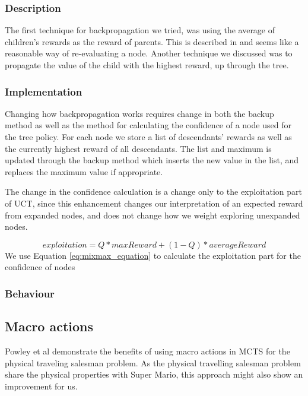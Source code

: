 \documentclass[10pt,a4paper]{article}
\begin{document}
\subsubsection*{Description}
The first technique for backpropagation we tried, was using the average of children's rewards as the reward of parents. This is described in %
and seems like a reasonable way of re-evaluating a node.
Another technique we discussed was to propagate the value of the child with the highest reward, up through the tree. %


\subsubsection*{Implementation}
Changing how backpropagation works requires change in both the backup method as well as the method for calculating the confidence of a node used for the tree policy.
For each node we store a list of descendants' rewards as well as the currently highest reward of all descendants. The list and maximum is updated through the backup method which inserts the new value in the list, and replaces the maximum value if appropriate.

The change in the confidence calculation is a change only to the exploitation part of UCT, since this enhancement changes our interpretation of an expected reward from expanded nodes, and does not change how we weight exploring unexpanded nodes.

\begin{equation}\label{eq:mixmax_equation}
exploitation = Q * maxReward + (1 - Q ) * averageReward
\end{equation}
We use Equation \ref{eq:mixmax_equation} to calculate the exploitation part for the confidence of nodes

\subsubsection*{Behaviour}

\subsection{Macro actions}
\label{macro}
Powley et al demonstrate the benefits of using macro actions in MCTS for the physical traveling salesman problem\cite{salesman}. As the physical travelling salesman problem share the physical properties with Super Mario, this approach might also show an improvement for us.
\end{document}
